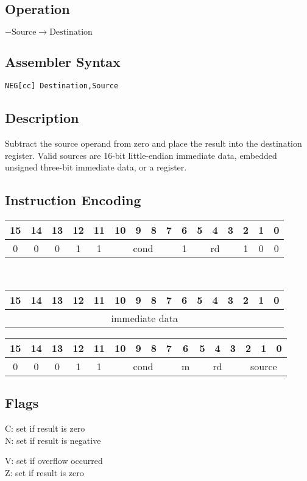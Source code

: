 \documentclass[11pt]{book}
\newcommand*{\encoding}[1]{\noindent
\begin{tabular}{|c|c|c|c|c|c|c|c|c|c|c|c|c|c|c|c|}
\multicolumn{1}{c}{15}&
\multicolumn{1}{c}{14}&
\multicolumn{1}{c}{13}&
\multicolumn{1}{c}{12}&
\multicolumn{1}{c}{11}&
\multicolumn{1}{c}{10}&
\multicolumn{1}{c}{9}&
\multicolumn{1}{c}{8}&
\multicolumn{1}{c}{7}&
\multicolumn{1}{c}{6}&
\multicolumn{1}{c}{5}&
\multicolumn{1}{c}{4}&
\multicolumn{1}{c}{3}&
\multicolumn{1}{c}{2}&
\multicolumn{1}{c}{1}&
\multicolumn{1}{c}{0}\\\hline
#1\\\hline
\end{tabular}}
\newcommand*{\instruction}[2][]{%
  \clearpage
  \thispagestyle{fancy}%
  \fancyhf[HL,HR]{\huge{#2}}%
  \fancyhf[HC]{#1}\addtocounter{section}{1}\noindent
}
\begin{document}

\instruction[Negate]{NEG}
\subsection*{Operation}
\(-\text{Source}\rightarrow\text{Destination}\)

\subsection*{Assembler Syntax}
\texttt{NEG[cc] Destination,Source}

\subsection*{Description}
Subtract the source operand from zero
and place the result into the destination register.
Valid sources are 16-bit little-endian immediate data,
embedded unsigned three-bit immediate data,
or a register.

\subsection*{Instruction Encoding}
\encoding{0&0&0&1&1%
&\multicolumn{4}{|c|}{cond}%
&1&\multicolumn{3}{|c|}{rd}&1&0&0}\\\null\qquad
\encoding{\multicolumn{16}{|c|}{immediate data}}

\vspace{2\baselineskip}
\encoding{0&0&0&1&1%
&\multicolumn{4}{|c|}{cond}%
&m&\multicolumn{3}{|c|}{rd}&\multicolumn{3}{|c|}{source}}

\subsection*{Flags}
\begin{multicols}{2}\noindent
  C: set if result is zero\\
  N: set if result is negative

  \columnbreak\noindent
  V: set if overflow occurred\\
  Z: set if result is zero
\end{multicols}
\end{document}
